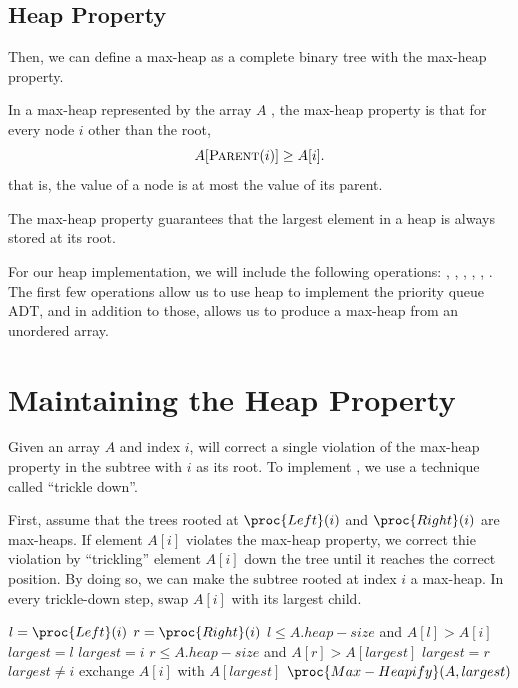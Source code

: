 \subsection{Heap Property}

Then, we can define a max-heap as a complete binary tree with the max-heap property.

\begin{definition}  
    In a max-heap represented by the array $A$ , the max-heap property is that for every node $i$ other than the root,
    \[
        A[\textsc{Parent}(i)] \geq A[i]
    .\]
    that is, the value of a node is at most the value of its parent.
\end{definition}

The max-heap property guarantees that the largest element in a heap is always stored at its root.

For our heap implementation, we will include the following operations: , , , , , . The first few operations allow us to use heap to implement the priority queue ADT, and in addition to those,  allows us to produce a max-heap from an unordered array.

\section{Maintaining the Heap Property}

Given an array $A$ and index $i$,  will correct a single violation of the max-heap property in the subtree with $i$ as its root. To implement , we use a technique called ``trickle down''.

First, assume that the trees rooted at $\proc{Left}(i)$ and $\proc{Right}(i)$ are max-heaps. If element $A[i]$ violates the max-heap property, we correct thie violation by ``trickling'' element $A[i]$ down the tree until it reaches the correct position. By doing so, we can make the subtree rooted at index $i$ a max-heap. In every trickle-down step, swap $A[i]$ with its largest child.

\begin{codebox}
    \li $l = \proc{Left}(i)$
    \li $r = \proc{Right}(i)$ 
    \li \If $l \leq A.heap-size$ and $A[l] > A[i]$
    \li \Then $largest = l$
    \li \Else $largest = i$
    \End
    \li \If $r \leq A.heap-size$ and $A[r] > A[largest]$ 
    \li \Then $largest = r$
    \End
    \li \If $largest \neq i$
    \li \Then exchange $A[i]$ with $A[largest]$
    \li       $\proc{Max-Heapify}(A,largest)$
    \End 
\end{codebox}

